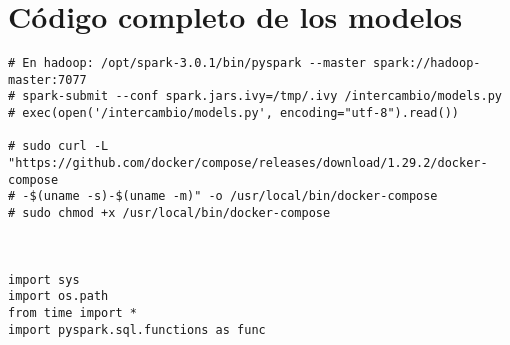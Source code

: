 \chapter{Código completo de los modelos}
\begin{verbatim}
# En hadoop: /opt/spark-3.0.1/bin/pyspark --master spark://hadoop-master:7077
# spark-submit --conf spark.jars.ivy=/tmp/.ivy /intercambio/models.py
# exec(open('/intercambio/models.py', encoding="utf-8").read())

# sudo curl -L "https://github.com/docker/compose/releases/download/1.29.2/docker-compose
# -$(uname -s)-$(uname -m)" -o /usr/local/bin/docker-compose
# sudo chmod +x /usr/local/bin/docker-compose



import sys
import os.path
from time import *
import pyspark.sql.functions as func


\end{verbatim}
